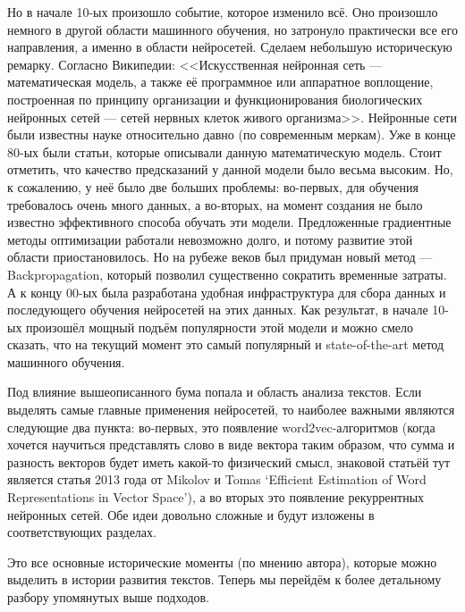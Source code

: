 \documentclass[a4paper,14pt]{extarticle}
\begin{document}
Но в начале 10-ых произошло событие, которое изменило всё. Оно произошло немного в другой области машинного обучения, но затронуло практически все его направления, а именно в области нейросетей. Сделаем небольшую историческую ремарку. Согласно Википедии: <<Искусственная нейронная сеть --- математическая модель, а также её программное или аппаратное воплощение, построенная по принципу организации и функционирования биологических нейронных сетей --- сетей нервных клеток живого организма>>. Нейронные сети были известны науке относительно давно (по современным меркам). Уже в конце 80-ых были статьи, которые описывали данную математическую модель. Стоит отметить, что качество предсказаний у данной модели было весьма высоким. Но, к сожалению, у неё было две больших проблемы: во-первых, для обучения требовалось очень много данных, а во-вторых, на момент создания не было известно эффективного способа обучать эти модели. Предложенные градиентные методы оптимизации работали невозможно долго, и потому развитие этой области приостановилось. Но на рубеже веков был придуман новый метод --- Backpropagation, который позволил существенно сократить временные затраты. А к концу 00-ых была разработана удобная инфраструктура для сбора данных и последующего обучения нейросетей на этих данных. Как результат, в начале 10-ых произошёл мощный подъём популярности этой модели и можно смело сказать, что на текущий момент это самый популярный и state-of-the-art метод машинного обучения.

Под влияние вышеописанного бума попала и область анализа текстов. Если выделять самые главные применения нейросетей, то наиболее важными являются следующие два пункта: во-первых, это появление word2vec-алгоритмов (когда хочется научиться представлять слово в виде вектора таким образом, что сумма и разность векторов будет иметь какой-то физический смысл, знаковой статьёй тут является статья 2013 года от Mikolov и Tomas `Efficient Estimation of Word Representations in Vector Space'), а во вторых это появление рекуррентных нейронных сетей. Обе идеи довольно сложные и будут изложены в соответствующих разделах.

Это все основные исторические моменты (по мнению автора), которые можно выделить в истории развития текстов. Теперь мы перейдём к более детальному разбору упомянутых выше подходов. 
\end{document}
